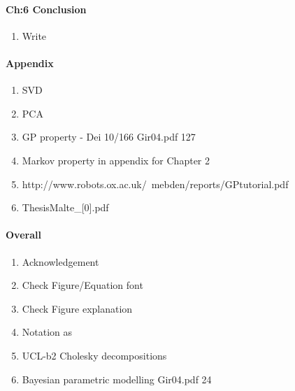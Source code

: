 \documentclass[a4paper,10pt]{article}
\begin{document}
\paragraph{Ch:6 Conclusion}
\begin{enumerate}
 \item Write
\end{enumerate}

\paragraph{Appendix}
\begin{enumerate}
 \item SVD
 \item PCA
 \item GP property - Dei 10/166  Gir04.pdf 127
 \item Markov property in appendix for Chapter 2
 \item http://www.robots.ox.ac.uk/~mebden/reports/GPtutorial.pdf
 \item ThesisMalte_[0].pdf
\end{enumerate}

\paragraph{Overall}
\begin{enumerate}
 \item Acknowledgement 
 \item Check Figure/Equation font
 \item Check Figure explanation
 \item Notation as %
 \item UCL-b2 Cholesky decompositions
 \item Bayesian parametric modelling Gir04.pdf 24
 
\end{enumerate}
\end{document}
